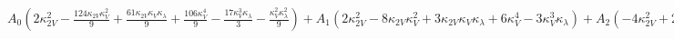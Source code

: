 $
A_{0} \left(2 \kappa_{2V}^{2} - \frac{124 \kappa_{2V} \kappa_{V}^{2}}{9} + \frac{61 \kappa_{2V} \kappa_{V} \kappa_{\lambda}}{9} + \frac{106 \kappa_{V}^{4}}{9} - \frac{17 \kappa_{V}^{3} \kappa_{\lambda}}{3} - \frac{\kappa_{V}^{2} \kappa_{\lambda}^{2}}{9}\right) + A_{1} \left(2 \kappa_{2V}^{2} - 8 \kappa_{2V} \kappa_{V}^{2} + 3 \kappa_{2V} \kappa_{V} \kappa_{\lambda} + 6 \kappa_{V}^{4} - 3 \kappa_{V}^{3} \kappa_{\lambda}\right) + A_{2} \left(- 4 \kappa_{2V}^{2} + 20 \kappa_{2V} \kappa_{V}^{2} - 8 \kappa_{2V} \kappa_{V} \kappa_{\lambda} - 16 \kappa_{V}^{4} + 8 \kappa_{V}^{3} \kappa_{\lambda}\right) + A_{3} \left(16 \kappa_{2V} \kappa_{V}^{2} - 16 \kappa_{2V} \kappa_{V} \kappa_{\lambda} - 16 \kappa_{V}^{4} + 16 \kappa_{V}^{3} \kappa_{\lambda}\right) + A_{4} \left(\frac{4 \kappa_{2V} \kappa_{V}^{2}}{5} - \frac{4 \kappa_{2V} \kappa_{V} \kappa_{\lambda}}{5} + \frac{\kappa_{V}^{4}}{5} - \frac{3 \kappa_{V}^{3} \kappa_{\lambda}}{10} + \frac{\kappa_{V}^{2} \kappa_{\lambda}^{2}}{10}\right) + A_{5} \left(- \frac{\kappa_{2V} \kappa_{V}^{2}}{45} + \frac{\kappa_{2V} \kappa_{V} \kappa_{\lambda}}{45} + \frac{\kappa_{V}^{4}}{45} - \frac{\kappa_{V}^{3} \kappa_{\lambda}}{30} + \frac{\kappa_{V}^{2} \kappa_{\lambda}^{2}}{90}\right)
$

